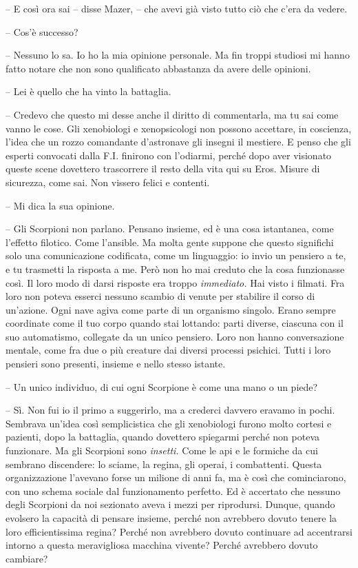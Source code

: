 {-- E così ora sai -- disse Mazer, -- che avevi già visto tutto ciò che
	c'era da vedere.}

{-- Cos'è successo?}

{-- Nessuno lo sa. Io ho la mia opinione personale. Ma fin troppi
	studiosi mi hanno fatto notare che non sono qualificato abbastanza da
	avere delle opinioni.}

{-- Lei è quello che ha vinto la battaglia.}

{-- Credevo che questo mi desse anche il diritto di commentarla, ma tu
	sai come vanno le cose. Gli xenobiologi e xenopsicologi non possono
	accettare, in coscienza, l'idea che un rozzo comandante d'astronave gli
	insegni il mestiere. E penso che gli esperti convocati dalla F.I.
	finirono con l'odiarmi, perché dopo aver visionato queste scene
	dovettero trascorrere il resto della vita qui su Eros. Misure di
	sicurezza, come sai. Non vissero felici e contenti.}

{-- Mi dica la sua opinione.}

{-- Gli Scorpioni non parlano. Pensano insieme, ed è una cosa
	istantanea, come l'effetto filotico. Come l'ansible. Ma molta gente
	suppone che questo significhi solo una comunicazione codificata, come un
	linguaggio: io invio un pensiero a te, e tu trasmetti la risposta a me.
	Però non ho mai creduto che la cosa funzionasse così. Il loro modo di
	darsi risposte era troppo \emph{immediato.} Hai visto i filmati. Fra
	loro non poteva esserci nessuno scambio di venute per stabilire il corso
	di un'azione. Ogni nave agiva come parte di un organismo singolo. Erano
	sempre coordinate come il tuo corpo quando stai lottando: parti diverse,
	ciascuna con il suo automatismo, collegate da un unico pensiero. Loro
	non hanno conversazione mentale, come fra due o più creature dai diversi
	processi psichici. Tutti i loro pensieri sono presenti, insieme e nello
	stesso istante.}

{-- Un unico individuo, di cui ogni Scorpione è come una mano o un
	piede?}

{-- Sì. Non fui io il primo a suggerirlo, ma a crederci davvero eravamo
	in pochi. Sembrava un'idea così semplicistica che gli xenobiologi furono
	molto cortesi e pazienti, dopo la battaglia, quando dovettero spiegarmi
	perché non poteva funzionare. Ma gli Scorpioni sono \emph{insetti.} Come
	le api e le formiche da cui sembrano discendere: lo sciame, la regina,
	gli operai, i combattenti. Questa organizzazione l'avevano forse un
	milione di anni fa, ma è così che cominciarono, con uno schema sociale
	dal funzionamento perfetto. Ed è accertato che nessuno degli Scorpioni
	da noi sezionato aveva i mezzi per riprodursi. Dunque, quando evolsero
	la capacità di pensare insieme, perché non avrebbero dovuto tenere la
	loro efficientissima regina? Perché non avrebbero dovuto continuare ad
	accentrarsi intorno a questa meravigliosa macchina vivente? Perché
	avrebbero dovuto cambiare?}

